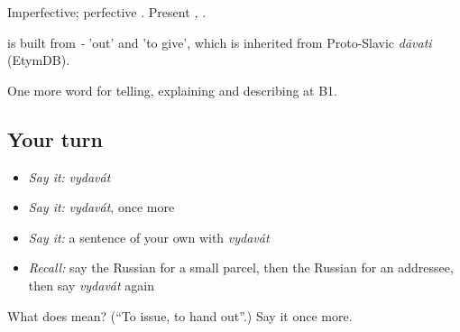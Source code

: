 Imperfective; perfective \emph{}. Present \emph{, }.

\begin{cousinweb}
\emph{} is built from \emph{-} 'out' and \emph{} 'to give', which is inherited from Proto-Slavic \emph{dāvati} (EtymDB).
\end{cousinweb}

\begin{grammarlens}[title={What you've built}]
One more word for telling, explaining and describing at B1.
\end{grammarlens}

\subsection*{Your turn}
\begin{itemize}
\raggedright
  \item \emph{Say it:} \emph{vydavát}
  \item \emph{Say it:} \emph{vydavát}, once more
  \item \emph{Say it:} a sentence of your own with \emph{vydavát}
  \item \emph{Recall:} say the Russian for a small parcel, then the Russian for an addressee, then say \emph{vydavát} again
\end{itemize}

\begin{tcolorbox}[breakable,colback=teal!4,colframe=teal!35!black,title={Before you move on}]
What does  mean? (\textquotedblleft{}To issue, to hand out\textquotedblright{}.) Say it once more.
\end{tcolorbox}
